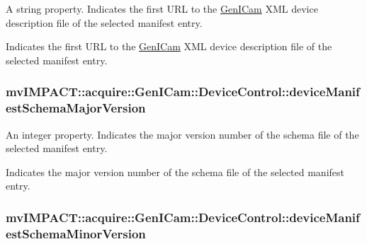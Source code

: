 A string property. Indicates the first U\+R\+L to the \hyperlink{namespacemv_i_m_p_a_c_t_1_1acquire_1_1_gen_i_cam}{Gen\+I\+Cam} X\+M\+L device description file of the selected manifest entry. 

Indicates the first U\+R\+L to the \hyperlink{namespacemv_i_m_p_a_c_t_1_1acquire_1_1_gen_i_cam}{Gen\+I\+Cam} X\+M\+L device description file of the selected manifest entry. \hypertarget{classmv_i_m_p_a_c_t_1_1acquire_1_1_gen_i_cam_1_1_device_control_a2cf29c5fda19d84c7243e8ba39f456ab}{
\subsubsection[{device\+Manifest\+Schema\+Major\+Version}]{ mv\+I\+M\+P\+A\+C\+T\+::acquire\+::\+Gen\+I\+Cam\+::\+Device\+Control\+::device\+Manifest\+Schema\+Major\+Version}}\label{classmv_i_m_p_a_c_t_1_1acquire_1_1_gen_i_cam_1_1_device_control_a2cf29c5fda19d84c7243e8ba39f456ab}


An integer property. Indicates the major version number of the schema file of the selected manifest entry. 

Indicates the major version number of the schema file of the selected manifest entry. \hypertarget{classmv_i_m_p_a_c_t_1_1acquire_1_1_gen_i_cam_1_1_device_control_ac7bf26e02f8c8c0fc2cae2e4cb822080}{
\subsubsection[{device\+Manifest\+Schema\+Minor\+Version}]{ mv\+I\+M\+P\+A\+C\+T\+::acquire\+::\+Gen\+I\+Cam\+::\+Device\+Control\+::device\+Manifest\+Schema\+Minor\+Version}}\label{classmv_i_m_p_a_c_t_1_1acquire_1_1_gen_i_cam_1_1_device_control_ac7bf26e02f8c8c0fc2cae2e4cb822080}


